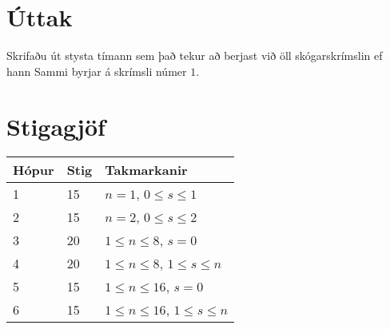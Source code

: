 \section*{Úttak}
Skrifaðu út stysta tímann sem það tekur að berjast við öll skógarskrímslin ef hann Sammi byrjar á skrímsli númer $1$.

\section*{Stigagjöf}
\begin{tabular}{|l|l|l|}
\hline
Hópur & Stig & Takmarkanir \\ \hline
1     & 15   & $n = 1$, $0 \leq s \leq 1$ \\ \hline
2     & 15   & $n = 2$, $0 \leq s \leq 2$ \\ \hline
3     & 20   & $1 \leq n \leq 8$, $s = 0$ \\ \hline
4     & 20   & $1 \leq n \leq 8$, $1 \leq s \leq n$ \\ \hline
5     & 15   & $1 \leq n \leq 16$, $s = 0$ \\ \hline
6     & 15   & $1 \leq n \leq 16$, $1 \leq s \leq n$ \\ \hline
\end{tabular}

